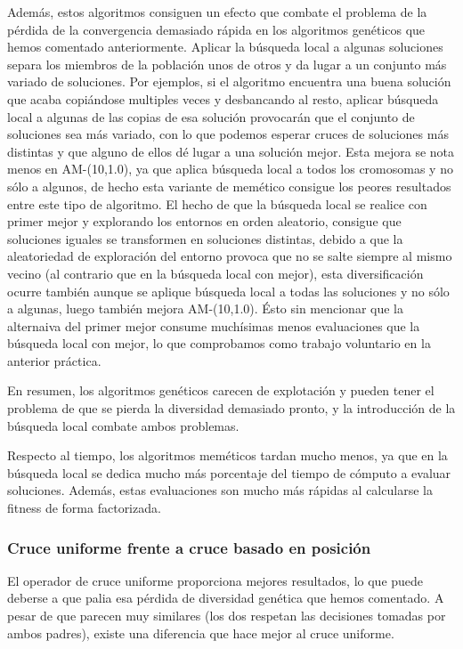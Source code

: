 \documentclass{article}
\begin{document}
Además, estos algoritmos consiguen un
efecto que combate el problema de la pérdida de la convergencia demasiado rápida en los algoritmos genéticos que hemos comentado
anteriormente. Aplicar la búsqueda local a algunas soluciones separa los miembros de la población unos de otros y da lugar a un
conjunto más variado de soluciones. Por ejemplos, si el algoritmo encuentra una buena solución que acaba copiándose multiples veces
y desbancando al resto, aplicar búsqueda local a algunas de las copias de esa solución provocarán que el conjunto de soluciones sea
más variado, con lo que podemos esperar cruces de soluciones más distintas y que alguno de ellos dé lugar a una solución mejor. Esta mejora
se nota menos en AM-(10,1.0), ya que aplica búsqueda local a todos los cromosomas y no sólo a algunos, de hecho esta variante de memético
consigue los peores resultados entre este tipo de algoritmo. El hecho de que la búsqueda local se realice con primer mejor y explorando
los entornos en orden aleatorio, consigue que soluciones iguales se transformen en soluciones distintas, debido a que la aleatoriedad de
exploración del entorno provoca que no se salte siempre al mismo vecino (al contrario que en la búsqueda local con mejor), esta
 diversificación ocurre también aunque se aplique búsqueda local a todas las soluciones y no sólo a algunas, luego también mejora 
  AM-(10,1.0). Ésto sin mencionar que la alternaiva del primer mejor consume muchísimas menos evaluaciones que la búsqueda local con mejor,
  lo que comprobamos como trabajo voluntario en la anterior práctica.
  
En resumen, los algoritmos genéticos carecen de explotación y pueden tener el problema de que se pierda la diversidad demasiado pronto,
y la introducción de la búsqueda local combate ambos problemas.

Respecto al tiempo, los algoritmos meméticos tardan mucho menos, ya que en la búsqueda local se dedica mucho más porcentaje del
tiempo de cómputo a evaluar soluciones. Además, estas evaluaciones son mucho más rápidas al calcularse la fitness de forma
factorizada.
  
\subsubsection*{Cruce uniforme frente a cruce basado en posición}

El operador de cruce uniforme proporciona mejores resultados, lo que puede deberse a que palia esa pérdida de diversidad genética que
hemos comentado. A pesar de que parecen muy similares (los dos respetan las decisiones tomadas por ambos padres), existe una diferencia
que hace mejor al cruce uniforme.
\end{document}
